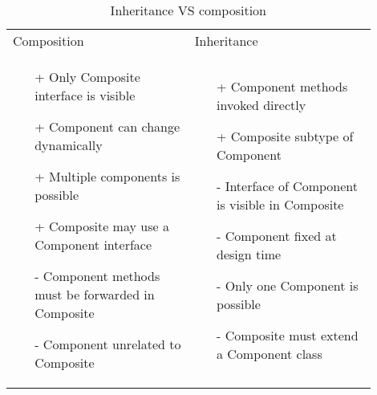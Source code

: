 \begin{table}[!ht]
    \begin{tabular}{p{0.45\linewidth}p{0.45\linewidth}}
        Composition & Inheritance \\
        \begin{minipage}{\linewidth}
            \begin{center}
                
            \end{center}

            \begin{itemize}
                \item[+] Only Composite interface is visible
                \item[+] Component can change dynamically
                \item[+] Multiple components is possible
                \item[+] Composite may use a Component
                interface
                \item[-] Component methods must be forwarded
                in Composite
                \item[-] Component unrelated to Composite
            \end{itemize}
        \end{minipage}
        &
        \begin{minipage}{\linewidth}
            \begin{center}
                
            \end{center}
            \begin{itemize}
                \item[+] Component methods invoked directly
                \item[+] Composite subtype of Component
                \item[-] Interface of Component is visible in
                Composite
                \item[-] Component fixed at design time
                \item[-] Only one Component is possible
                \item[-] Composite must extend a Component
                class
            \end{itemize}
        \end{minipage}
    \end{tabular}
    \caption{Inheritance VS composition}
\end{table}

